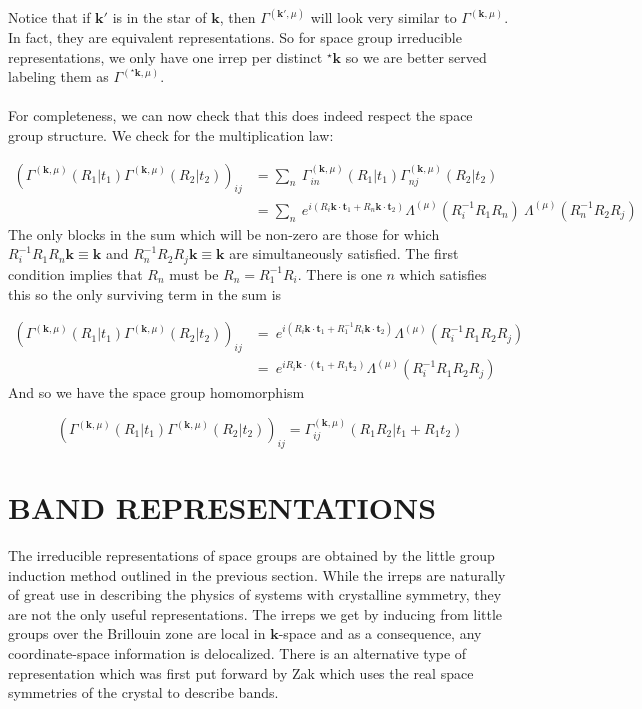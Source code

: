 \documentclass[9 pt]{report}
\def\*#1{\boldsymbol{#1}}
\begin{document}
Notice that if $\*k'$ is in the star of $\*k$, then $\Gamma^{(\*k',\mu)}$ will look very similar to $\Gamma^{(\*k,\mu)}$. In fact, they are equivalent representations. So for space group irreducible representations, we only have one irrep per distinct $^\star\*k$ so we are better served labeling them as $\Gamma^{(^\star\*k,\mu)}$.
\\
\\
For completeness, we can now check that this does indeed respect the space group structure. We check for the multiplication law:

\begin{align}
 \left( \Gamma^{(\*k,\mu)}(R_1|t_1) \Gamma^{(\*k,\mu)}(R_2|t_2) \right)_{ij} &= \sum_{n}\:\Gamma^{(\*k,\mu)}_{in}(R_1|t_1)\Gamma^{(\*k,\mu)}_{nj}(R_2|t_2) \nonumber\\
 &= \sum_n\:e^{i\left(R_i\*k\cdot\*t_1 + R_n\*k\cdot\*t_2\right)}\Lambda^{(\mu)}(R_i^{-1}R_1R_n)\:\Lambda^{(\mu)}(R_n^{-1}R_2R_j) \nonumber
\end{align}
The only blocks in the sum which will be non-zero are those for which $R_i^{-1}R_1R_n\*k\equiv\*k$ and $R_n^{-1}R_2R_j\*k \equiv \*k$ are simultaneously satisfied. The first condition implies that $R_n$ must be $R_n=R_1^{-1}R_i$. There is one $n$ which satisfies this so the only surviving term in the sum is

\begin{align} 
\left( \Gamma^{(\*k,\mu)}(R_1|t_1) \Gamma^{(\*k,\mu)}(R_2|t_2) \right)_{ij} &= \:e^{i\left(R_i\*k\cdot\*t_1 + R_1^{-1}R_i\*k\cdot\*t_2  \right)} \Lambda^{(\mu)}(R_i^{-1}R_1R_2R_j) \nonumber\\
 &= \:e^{iR_i\*k\cdot\left(\*t_1 + R_1\*t_2  \right)} \Lambda^{(\mu)}(R_i^{-1}R_1R_2R_j) \nonumber
 \end{align}
 And so we have the space group homomorphism 
 
 $$ \left( \Gamma^{(\*k,\mu)}(R_1|t_1) \Gamma^{(\*k,\mu)}(R_2|t_2) \right)_{ij} = \Gamma^{(\*k,\mu)}_{ij}\left(R_1R_2|t_1 + R_1t_2\right) $$


\newpage



{\centering
\section*{BAND REPRESENTATIONS}}
The irreducible representations of space groups are obtained by the little group induction method outlined in the previous section. While the irreps are naturally of great use in describing the physics of systems with crystalline symmetry, they are not the only useful representations. The irreps we get by inducing from little groups over the Brillouin zone are local in $\*k$-space and as a consequence, any coordinate-space information is delocalized. There is an alternative type of representation which was first put forward by Zak which uses the real space symmetries of the crystal to describe bands.
\end{document}
